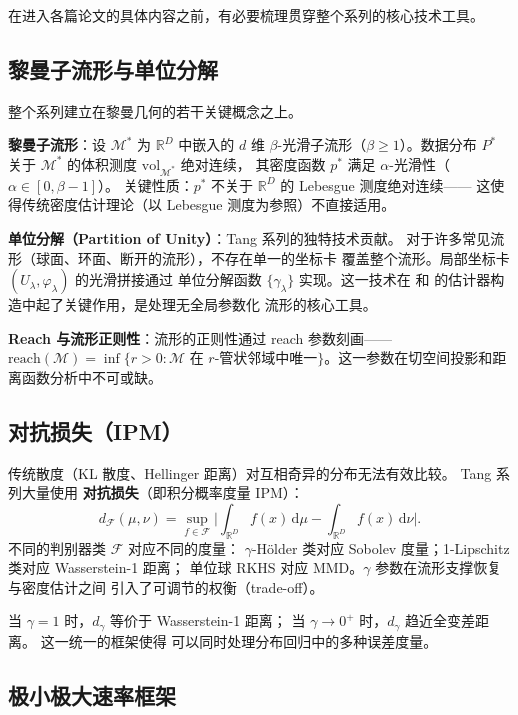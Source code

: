 \documentclass[12pt]{amsbook}
\theoremstyle{plain}
\begin{document}
在进入各篇论文的具体内容之前，有必要梳理贯穿整个系列的核心技术工具。

\subsection{黎曼子流形与单位分解}\label{sec:tang-manifold}

整个系列建立在黎曼几何的若干关键概念之上。

\textbf{黎曼子流形}：设 $\mathcal{M}^*$ 为 $\mathbb{R}^D$ 中嵌入的
$d$ 维 $\beta$-光滑子流形（$\beta \geq 1$）。数据分布 $P^*$ 关于
$\mathcal{M}^*$ 的体积测度 $\mathrm{vol}_{\mathcal{M}^*}$ 绝对连续，
其密度函数 $p^*$ 满足 $\alpha$-光滑性（$\alpha \in [0,\beta-1]$）。
关键性质：$p^*$ 不关于 $\mathbb{R}^D$ 的 Lebesgue 测度绝对连续——
这使得传统密度估计理论（以 Lebesgue 测度为参照）不直接适用。

\textbf{单位分解（Partition of Unity）}：Tang 系列的独特技术贡献。
对于许多常见流形（球面、环面、断开的流形），不存在单一的坐标卡
覆盖整个流形。局部坐标卡 $(U_\lambda, \varphi_\lambda)$ 的光滑拼接通过
单位分解函数 $\{\gamma_\lambda\}$ 实现。这一技术在
\citep{tang2022minimax} 和 \citep{tang2023lowdim} 的估计器构造中起了关键作用，是处理无全局参数化
流形的核心工具。

\textbf{Reach 与流形正则性}：流形的正则性通过 reach 参数刻画——
$\mathrm{reach}(\mathcal{M}) = \inf\{r > 0 : \mathcal{M}$ 在
$r$-管状邻域中唯一$\}$。这一参数在切空间投影和距离函数分析中不可或缺。

\subsection{对抗损失（IPM）}\label{sec:tang-ipm}

传统散度（KL 散度、Hellinger 距离）对互相奇异的分布无法有效比较。
Tang 系列大量使用 \textbf{对抗损失}（即积分概率度量 IPM）：
\[
d_{\mathcal{F}}(\mu,\nu) = \sup_{f \in \mathcal{F}} \Big|
\int_{\mathbb{R}^D} f(x) \, \mathrm{d}\mu - \int_{\mathbb{R}^D} f(x) \, \mathrm{d}\nu\Big|.
\]
不同的判别器类 $\mathcal{F}$ 对应不同的度量：
$\gamma$-Hölder 类对应 Sobolev 度量；1-Lipschitz 类对应 Wasserstein-1 距离；
单位球 RKHS 对应 MMD。$\gamma$ 参数在流形支撑恢复与密度估计之间
引入了可调节的权衡（trade-off）。

当 $\gamma = 1$ 时，$d_\gamma$ 等价于 Wasserstein-1 距离；
当 $\gamma \to 0^+$ 时，$d_\gamma$ 趋近全变差距离。
这一统一的框架使得 \citep{tang2025regression} 可以同时处理分布回归中的多种误差度量。

\subsection{极小极大速率框架}\label{sec:tang-minimax}
\end{document}
